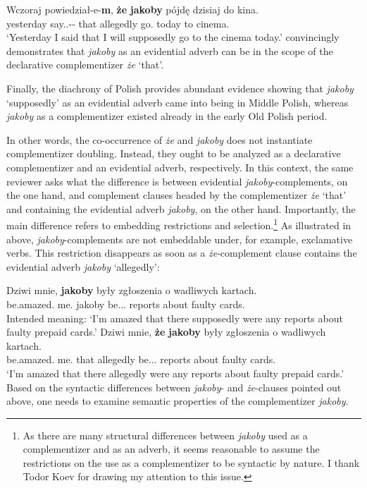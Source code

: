 \documentclass[output=paper
,modfonts
,nonflat]{langsci/langscibook}
\begin{document}
\ea  \label{plecak} \gll Wczoraj powiedział-e-\textbf{m}, \textbf{że} \textbf{jakoby} pójdę dzisiaj do kina.\\
  		yesterday say.{\lptcp}.{\sg}-{\masc}-{\firstperson}{\sg} that allegedly go.{\firstperson}{\sg} today to cinema.{\gen}\\
\glt	`Yesterday I said that  I will supposedly go to the cinema today.'
\z
{} convincingly demonstrates that \emph{jakoby} as an evidential adverb can be in the scope of the declarative complementizer \emph{że} `that'. 

\noindent Finally, the diachrony of Polish provides abundant evidence showing that \emph{jakoby} `supposedly' as an evidential adverb came into being in Middle Polish, whereas \emph{jakoby} as a complementizer existed already in the early Old Polish period. 

In other words, the co-occurrence of \emph{że} and \emph{jakoby} does not instantiate complementizer doubling. Instead, they ought to be analyzed as a declarative complementizer and an evidential adverb, respectively. In this context, the same reviewer asks what the difference is between evidential \emph{jakoby}-complements, on the one hand, and complement clauses headed by the complementizer \emph{że} `that' and containing the evidential adverb \emph{jakoby}, on the other hand. Importantly, the main difference refers to embedding restrictions and selection.\footnote{As there are many structural differences between \emph{jakoby} used as a complementizer and as an adverb, it seems reasonable to assume the restrictions on the use as a complementizer to be syntactic by nature. I thank Todor Koev for drawing my attention to this issue.
}
As illustrated in  above, \emph{jakoby}-complements are not embeddable under, for example, exclamative verbs. This restriction disappears as soon as a \emph{że}-complement clause contains the evidential adverb \emph{jakoby}  `allegedly':

\ea \ea \gll		*Dziwi mnie, \textbf{jakoby} były zgłoszenia o wadliwych kartach. \\
			be.amazed.{\thirdperson}{\sg} me.{\acc} jakoby be.{\lptcp}.{\nvir}.{\pl} reports about faulty cards.{\loc} \\
	\glt		Intended meaning: `I'm amazed that there supposedly were any reports about faulty prepaid cards.' 
	\ex \gll		Dziwi mnie, \textbf{że} \textbf{jakoby} były zgłoszenia o wadliwych kartach. \\
			be.amazed.{\thirdperson}{\sg} me.{\acc} that allegedly be.{\lptcp}.{\nvir}.{\pl} reports about faulty cards.{\loc} \\
	\glt		`I'm amazed that there allegedly were any reports about faulty prepaid cards.' 
\z\z	
Based on the syntactic differences between \emph{jakoby}- and \emph{że}-clauses pointed out above, one needs to examine semantic properties of the complementizer \emph{jakoby}.
\end{document}
